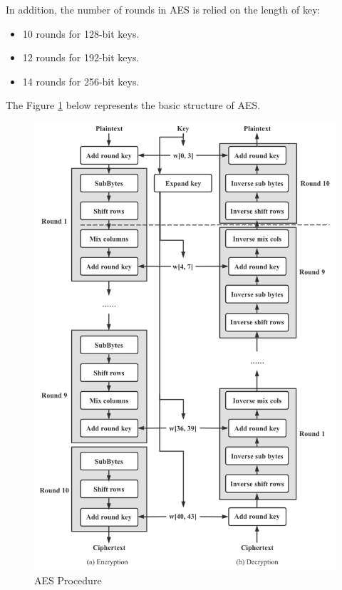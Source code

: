 \documentclass[11pt]{article}
\begin{document}
In addition, the number of rounds in AES is relied on the length of key:

\begin{itemize}
    \item 10 rounds for 128-bit keys.
    \item 12 rounds for 192-bit keys.
    \item 14 rounds for 256-bit keys.
\end{itemize}

The Figure \ref{fig:aes_procudure} below represents the basic structure of AES.

\begin{figure}[h!]
\centering
\includegraphics[scale=0.5]{aes_procudure}
\caption{AES Procedure}
\label{fig:aes_procudure}
\end{figure}
\end{document}
